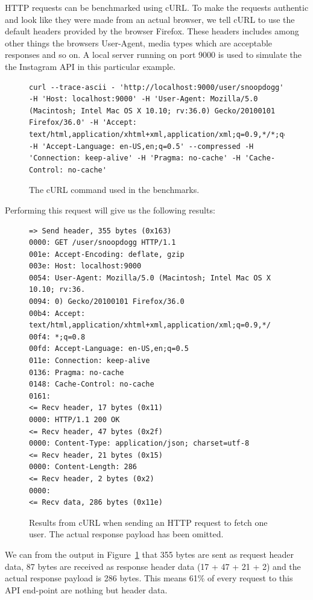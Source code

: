 \documentclass{cslthse-msc}
\begin{document}
HTTP requests can be benchmarked using cURL\cite{curl}. To make the requests authentic and look like they were made from an actual browser, we tell cURL to use the default headers provided by the browser Firefox. These headers includes among other things the browsers User-Agent, media types which are acceptable responses and so on. A local server running on port 9000 is used to simulate the the Instagram API in this particular example.

\begin{figure}[H]
  \centering
\begin{lstlisting}[breaklines=true]
curl --trace-ascii - 'http://localhost:9000/user/snoopdogg' -H 'Host: localhost:9000' -H 'User-Agent: Mozilla/5.0 (Macintosh; Intel Mac OS X 10.10; rv:36.0) Gecko/20100101 Firefox/36.0' -H 'Accept: text/html,application/xhtml+xml,application/xml;q=0.9,*/*;q=0.8' -H 'Accept-Language: en-US,en;q=0.5' --compressed -H 'Connection: keep-alive' -H 'Pragma: no-cache' -H 'Cache-Control: no-cache'
\end{lstlisting}
  \caption{The cURL command used in the benchmarks.}
\end{figure}

Performing this request will give us the following results:

\begin{figure}[H]
  \centering
\begin{lstlisting}[breaklines=true]
=> Send header, 355 bytes (0x163)
0000: GET /user/snoopdogg HTTP/1.1
001e: Accept-Encoding: deflate, gzip
003e: Host: localhost:9000
0054: User-Agent: Mozilla/5.0 (Macintosh; Intel Mac OS X 10.10; rv:36.
0094: 0) Gecko/20100101 Firefox/36.0
00b4: Accept: text/html,application/xhtml+xml,application/xml;q=0.9,*/
00f4: *;q=0.8
00fd: Accept-Language: en-US,en;q=0.5
011e: Connection: keep-alive
0136: Pragma: no-cache
0148: Cache-Control: no-cache
0161:
<= Recv header, 17 bytes (0x11)
0000: HTTP/1.1 200 OK
<= Recv header, 47 bytes (0x2f)
0000: Content-Type: application/json; charset=utf-8
<= Recv header, 21 bytes (0x15)
0000: Content-Length: 286
<= Recv header, 2 bytes (0x2)
0000:
<= Recv data, 286 bytes (0x11e)
\end{lstlisting}
  \caption{Results from cURL when sending an HTTP request to fetch one user. The actual response payload has been omitted.}
  \label{fig:headers_overhead}
\end{figure}

We can from the output in Figure~\ref{fig:headers_overhead} that 355 bytes are sent as request header data, 87 bytes are received as response header data (17 + 47 + 21 + 2) and the actual response payload is 286 bytes. This means 61\% of every request to this API end-point are nothing but header data.
\end{document}

